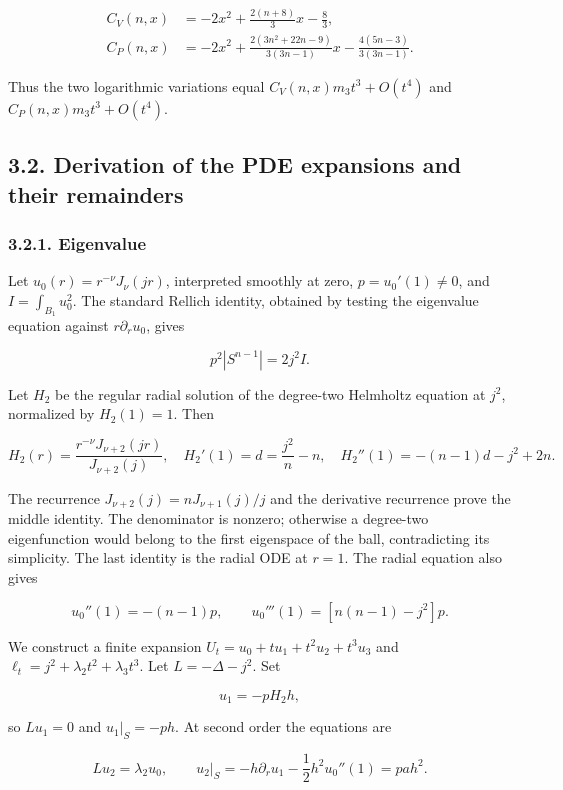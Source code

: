 \documentclass[11pt]{article}
\begin{document}
\[
\begin{aligned}
C_V(n,x)&=-2x^2+\frac{2(n+8)}3x-\frac83,\\
C_P(n,x)&=-2x^2+
\frac{2(3n^2+22n-9)}{3(3n-1)}x
-\frac{4(5n-3)}{3(3n-1)}.
\end{aligned}
\tag{3.6}
\]

Thus the two logarithmic variations equal \(C_V(n,x)m_3t^3+O(t^4)\) and
\(C_P(n,x)m_3t^3+O(t^4)\).

\subsection{3.2. Derivation of the PDE expansions and their
remainders}\label{derivation-of-the-pde-expansions-and-their-remainders}

\subsubsection{3.2.1. Eigenvalue}\label{eigenvalue}

Let \(u_0(r)=r^{-\nu}J_\nu(jr)\), interpreted smoothly at zero,
\(p=u_0'(1)\ne0\), and \(I=\int_{B_1}u_0^2\). The standard Rellich
identity, obtained by testing the eigenvalue equation against
\(r\partial_ru_0\), gives

\[
p^2|S^{n-1}|=2j^2 I.
\tag{3.7}
\]

Let \(H_2\) be the regular radial solution of the degree-two Helmholtz
equation at \(j^2\), normalized by \(H_2(1)=1\). Then

\[
H_2(r)=\frac{r^{-\nu}J_{\nu+2}(jr)}{J_{\nu+2}(j)},\quad
H_2'(1)=d=\frac{j^2}{n}-n,\quad
H_2''(1)=-(n-1)d-j^2+2n.
\tag{3.8}
\]

The recurrence \(J_{\nu+2}(j)=nJ_{\nu+1}(j)/j\) and the derivative
recurrence prove the middle identity. The denominator is nonzero;
otherwise a degree-two eigenfunction would belong to the first
eigenspace of the ball, contradicting its simplicity. The last identity
is the radial ODE at \(r=1\). The radial equation also gives

\[
u_0''(1)=-(n-1)p,\qquad
u_0'''(1)=[n(n-1)-j^2]p.
\tag{3.9}
\]

We construct a finite expansion \(U_t=u_0+tu_1+t^2u_2+t^3u_3\) and
\(\ell_t=j^2+\lambda_2t^2+\lambda_3t^3\). Let \(L=-\Delta-j^2\). Set

\[
u_1=-pH_2h,
\tag{3.10}
\]

so \(Lu_1=0\) and \(u_1|_S=-ph\). At second order the equations are

\[
Lu_2=\lambda_2u_0,\qquad
u_2|_S=-h\partial_ru_1-\frac12h^2u_0''(1)=pa h^2.
\tag{3.11}
\]
\end{document}
